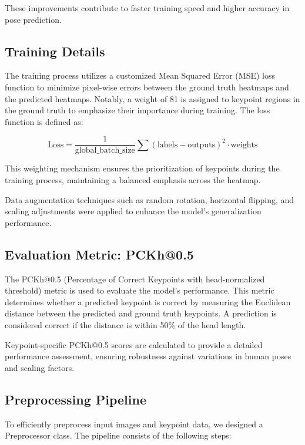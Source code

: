 \documentclass{article}
\begin{document}
These improvements contribute to faster training speed and higher accuracy in pose prediction.

\subsection{Training Details}

The training process utilizes a customized Mean Squared Error (MSE) loss function to minimize pixel-wise errors between the ground truth heatmaps and the predicted heatmaps. Notably, a weight of 81 is assigned to keypoint regions in the ground truth to emphasize their importance during training. The loss function is defined as:

\[
\text{Loss} = \frac{1}{\text{global\_batch\_size}} \sum (\text{labels} - \text{outputs})^2 \cdot \text{weights}
\]

This weighting mechanism ensures the prioritization of keypoints during the training process, maintaining a balanced emphasis across the heatmap.

Data augmentation techniques such as random rotation, horizontal flipping, and scaling adjustments were applied to enhance the model’s generalization performance.

\subsection{Evaluation Metric: PCKh@0.5}

The PCKh@0.5 (Percentage of Correct Keypoints with head-normalized threshold) metric is used to evaluate the model’s performance. This metric determines whether a predicted keypoint is correct by measuring the Euclidean distance between the predicted and ground truth keypoints. A prediction is considered correct if the distance is within 50\% of the head length.

Keypoint-specific PCKh@0.5 scores are calculated to provide a detailed performance assessment, ensuring robustness against variations in human poses and scaling factors.

\subsection{Preprocessing Pipeline}

To efficiently preprocess input images and keypoint data, we designed a Preprocessor class. The pipeline consists of the following steps:
\end{document}
